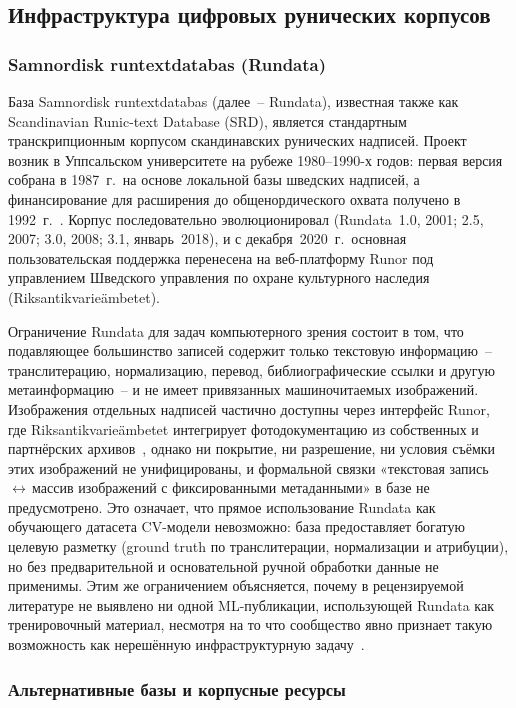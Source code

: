 \documentclass[a4paper,12pt]{extarticle}
\begin{document}
\subsection{Инфраструктура цифровых рунических корпусов}
\label{sec:corpora}

\subsubsection{Samnordisk runtextdatabas (Rundata)}

База Samnordisk runtextdatabas (далее~-- Rundata), известная также как Scandinavian Runic-text Database (SRD), является стандартным транскрипционным корпусом скандинавских рунических надписей. Проект возник в Уппсальском университете на рубеже 1980--1990-х годов: первая версия собрана в 1987~г.\ на основе локальной базы шведских надписей, а финансирование для расширения до общенордического охвата получено в 1992~г.~\cite{uu2024rundata}. Корпус последовательно эволюционировал (Rundata~1.0, 2001; 2.5, 2007; 3.0, 2008; 3.1, январь~2018), и с декабря~2020~г.\ основная пользовательская поддержка перенесена на веб-платформу Runor под управлением Шведского управления по охране культурного наследия (Riksantikvarieämbetet).

Ограничение Rundata для задач компьютерного зрения состоит в том, что подавляющее большинство записей содержит только текстовую информацию~-- транслитерацию, нормализацию, перевод, библиографические ссылки и другую метаинформацию~-- и не имеет привязанных машиночитаемых изображений. Изображения отдельных надписей частично доступны через интерфейс Runor, где Riksantikvarieämbetet интегрирует фотодокументацию из собственных и партнёрских архивов~\cite{riksant2024}, однако ни покрытие, ни разрешение, ни условия съёмки этих изображений не унифицированы, и формальной связки «текстовая запись\,$\leftrightarrow$\,массив изображений с фиксированными метаданными» в базе не предусмотрено. Это означает, что прямое использование Rundata как обучающего датасета CV-модели невозможно: база предоставляет богатую целевую разметку (ground truth по транслитерации, нормализации и атрибуции), но без предварительной и основательной ручной обработки данные не применимы.  Этим же ограничением объясняется, почему в рецензируемой литературе не выявлено ни одной ML-публикации, использующей Rundata как тренировочный материал, несмотря на то что сообщество явно признает такую возможность как нерешённую инфраструктурную задачу~\cite{williams2022,magin2024}.

\subsubsection{Альтернативные базы и корпусные ресурсы}
\end{document}

